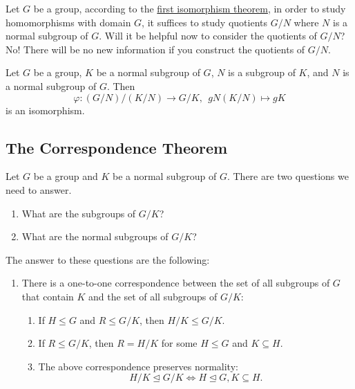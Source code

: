 Let \( G  \) be a group, according to the {\hyperref[first isomorphism theorem]{first isomorphism theorem}}, in order to study homomorphisms with domain \( G  \), it suffices to study quotients \( G /N  \) where \( N  \) is a normal subgroup of \( G  \). Will it be helpful now to consider the quotients of \( G / N  \)? No! There will be no new information if you construct the quotients of \( G / N  \).   

\begin{theorem}
       Let \( G  \) be a group, \( K  \) be a normal subgroup of \( G  \), \( N  \) is a subgroup of \( K  \), and \( N  \)  is a normal subgroup of \( G  \). Then
       \[  \varphi : (G / N) / (K / N) \to G / K ,   \ \  g N (K / N) \mapsto g K  \] is an isomorphism.
\end{theorem}

\subsection{The Correspondence Theorem}

Let \( G  \) be a group and \( K  \) be a normal subgroup of \( G  \). There are two questions we need to answer. 
\begin{enumerate}
    \item[(1)] What are the subgroups of \( G / K \)?
    \item[(2)] What are the normal subgroups of \( G / K  \)?
\end{enumerate}

The answer to these questions are the following:

\begin{enumerate}
    \item[(1)] There is a one-to-one correspondence between the set of all subgroups of \( G  \) that contain \( K  \) and the set of all subgroups of \( G / K  \): 
        \begin{enumerate}
            \item[(i)] If \( H \leq G  \) and \( R \leq G / K  \), then \( H / K \leq G / K  \).
            \item[(ii)] If \( R \leq G / K  \), then \( R = H / K    \) for some \( H \leq G  \) and \( K \subseteq  H  \).
            \item[(ii)] The above correspondence preserves normality:
                \[  H / K \trianglelefteq G / K  \iff H \trianglelefteq G , K \subseteq  H.  \]
        \end{enumerate}
\end{enumerate}

